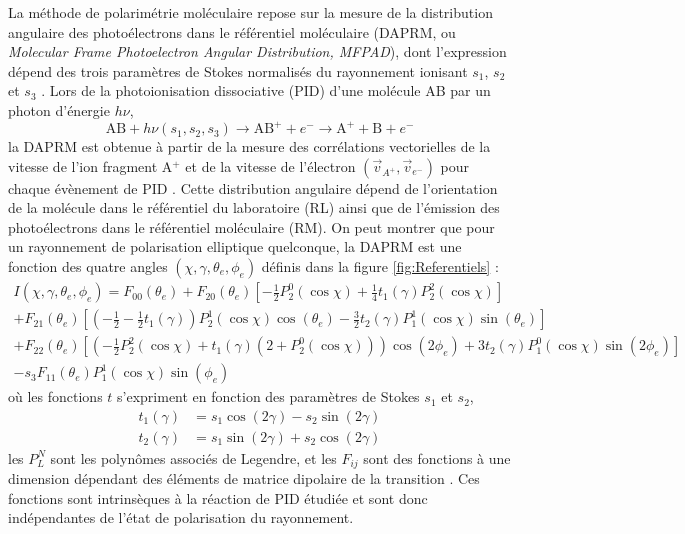 La méthode de polarimétrie moléculaire repose sur la mesure de la distribution angulaire des photoélectrons dans le référentiel moléculaire (DAPRM, ou \textit{Molecular Frame Photoelectron Angular Distribution, MFPAD}), dont l'expression dépend des trois paramètres de Stokes normalisés du rayonnement ionisant $s_1$, $s_2$ et $s_3$ . Lors de la photoionisation dissociative (PID) d'une molécule AB par un photon d'énergie $h \nu$,
\begin{equation}
\text{AB} + h \nu (s_1, s_2, s_3) \longrightarrow \text{AB}^+ + e^- \longrightarrow \text{A}^+ + \text{B} + e^- 
\end{equation}
la DAPRM est obtenue à partir de la mesure des corrélations vectorielles de la vitesse de l'ion fragment A$^+$ et de la vitesse de l'électron $(\vec{v}_{A^+}, \vec{v}_{e^-})$ pour chaque évènement de PID . Cette distribution angulaire dépend de l'orientation de la molécule dans le référentiel du laboratoire (RL) ainsi que de l'émission des photoélectrons dans le référentiel moléculaire (RM). On peut montrer que pour un rayonnement de polarisation elliptique quelconque, la DAPRM est une fonction des quatre angles $(\chi, \gamma, \theta_e, \phi_e)$ définis dans la figure \ref{fig:Referentiels} :
\begin{multline}
I(\chi, \gamma, \theta_e, \phi_e) = F_{00}(\theta_e) + F_{20}(\theta_e) \left[ - \frac{1}{2} P_2^0(\cos \chi) + \frac{1}{4} t_1(\gamma) P_2^2(\cos \chi) \right] \\
+ F_{21}(\theta_e) \left[ \left(-\frac{1}{2}-\frac{1}{2} t_1 (\gamma) \right) P_2^1(\cos \chi) \cos(\theta_e) - \frac{3}{2} t_2(\gamma) P_1^1(\cos \chi) \sin(\theta_e) \right] \\
+ F_{22}(\theta_e) \left[ \left( -\frac{1}{2} P_2^2(\cos \chi) + t_1(\gamma)(2 + P_2^0 (\cos \chi)) \right) \cos (2 \phi_e) + 3 t_2(\gamma) P_1^0 (\cos \chi) \sin(2 \phi_e) \right] \\
-s_3 F_{11}(\theta_e) P_1^1(\cos \chi) \sin(\phi_e)
\label{eq:MFPAD}
\end{multline}
où les fonctions $t$ s'expriment en fonction des paramètres de Stokes $s_1$ et $s_2$,
\begin{align}
t_1(\gamma) & = s_1 \cos(2\gamma) - s_2 \sin(2\gamma)\\
t_2(\gamma) & = s_1 \sin(2\gamma) + s_2 \cos(2\gamma)
\end{align}
les $P_L^N$ sont les polynômes associés de Legendre, et les $F_{ij}$ sont des fonctions à une dimension dépendant des éléments de matrice dipolaire de la transition . Ces fonctions sont intrinsèques à la réaction de PID étudiée et sont donc indépendantes de l'état de polarisation du rayonnement.

